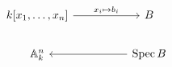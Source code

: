 \[
\begin{tikzcd}[column sep=huge]
k[x_1,\dots,x_n] \arrow[r,"x_i\mapsto b_i"] & B\\
\A^n_k & \Spec B \arrow[l]
\end{tikzcd}
\]

